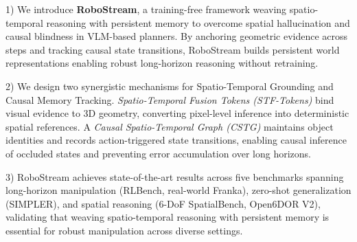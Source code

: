 1) We introduce \textbf{RoboStream}, a training-free framework weaving spatio-te\-m\-p\-o\-r\-a\-l reasoning with persistent memory to overcome spatial hallucination and causal blindness in VLM-based planners. By anchoring geometric evidence across steps and tracking causal state transitions, RoboStream builds persistent world representations enabling robust long-horizon reasoning without retraining.


2) We design two synergistic mechanisms for Spatio-Temporal Grounding and Causal Memory Tracking. \textit{Spatio-Temporal Fusion Tokens (STF-Tokens)} bind visual evidence to 3D geometry, converting pixel-level inference into deterministic spatial references. A \textit{Causal Spatio-Temporal Graph (CSTG)} maintains object identities and records action-triggered state transitions, enabling causal inference of occluded states and preventing error accumulation over long horizons.

3) RoboStream achieves state-of-the-art results across five benchmarks spanning long-horizon manipulation (RLBench, real-world Franka), zero-shot generalization (SIMPLER), and spatial reasoning (6-DoF SpatialBench, Open6DOR V2), validating that weaving spatio-temporal reasoning with persistent memory is essential for robust manipulation across diverse settings.



